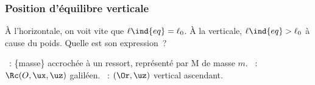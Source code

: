\documentclass[../../main/main.tex]{subfiles}
\begin{document}
\subsubsection{Position d'équilibre verticale}
\vspace*{-.7cm}
\noindent
\begin{minipage}{0.75\linewidth}
	À l'horizontale, on voit vite que $\ell\ind{eq} = \ell_0$. À la verticale,
	$\ell\ind{eq} > \ell_0$ à cause du poids. Quelle est son expression~?
	\begin{enumerate}[label=\sqenumi]
		~: \{masse\} accrochée à un ressort, représenté par M de masse
		$m$.
		~: $\Rc(O,\ux,\uz)$ galiléen.
		~: $(\Or, \uz)$ vertical ascendant.
	\end{enumerate}
\end{minipage}
\hfill
\end{document}
